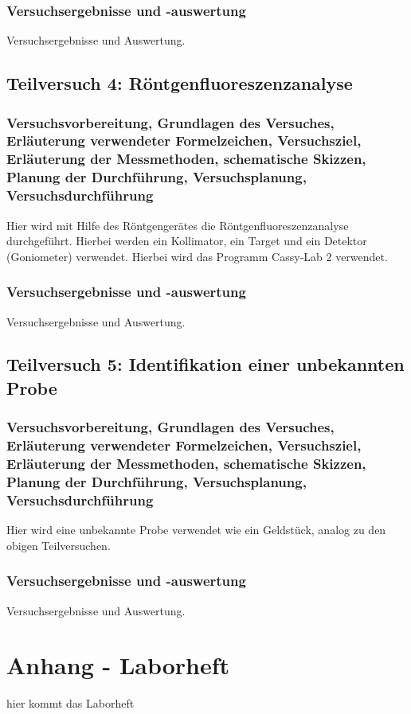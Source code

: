 \documentclass[12pt,oneside,oldfontcommands]{memoir}
\begin{document}
\subsubsection{Versuchsergebnisse und -auswertung}
Versuchsergebnisse und Auswertung.

\subsection{Teilversuch 4: Röntgenfluoreszenzanalyse}
\subsubsection{Versuchsvorbereitung, Grundlagen des Versuches, Erläuterung verwendeter Formelzeichen, Versuchsziel, Erläuterung der Messmethoden, schematische Skizzen, Planung der Durchführung, Versuchsplanung, Versuchsdurchführung}
Hier wird mit Hilfe des Röntgengerätes die Röntgenfluoreszenzanalyse durchgeführt. Hierbei werden ein Kollimator, ein Target und ein Detektor (Goniometer) verwendet. Hierbei wird das Programm Cassy-Lab 2 verwendet.
\subsubsection{Versuchsergebnisse und -auswertung}
Versuchsergebnisse und Auswertung.

\subsection{Teilversuch 5: Identifikation einer unbekannten Probe}
\subsubsection{Versuchsvorbereitung, Grundlagen des Versuches, Erläuterung verwendeter Formelzeichen, Versuchsziel, Erläuterung der Messmethoden, schematische Skizzen, Planung der Durchführung, Versuchsplanung, Versuchsdurchführung}
Hier wird eine unbekannte Probe verwendet wie ein Geldstück, analog zu den obigen Teilversuchen.

\subsubsection{Versuchsergebnisse und -auswertung}
Versuchsergebnisse und Auswertung.


\section{Anhang - Laborheft}
%
hier kommt das Laborheft
\end{document}
